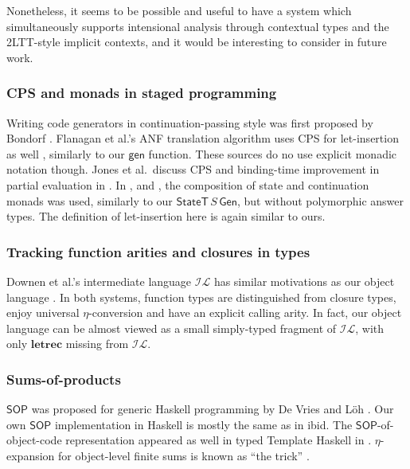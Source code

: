 \documentclass[acmsmall,screen]{acmart}
\newcommand{\mit}[1]{{\mathsf{#1}}}
\newcommand{\msf}[1]{{\mathsf{#1}}}
\newcommand{\mbf}[1]{{\mathbf{#1}}}
\newcommand{\SOP}{\msf{SOP}}
\theoremstyle{remark}
\newcommand{\Gen}{\msf{Gen}}
\newcommand{\gen}{\mit{gen}}
\newcommand{\StateT}{\msf{StateT}}
\begin{document}
Nonetheless, it seems to be possible and useful to have a
system which simultaneously supports intensional analysis through contextual
types and the 2LTT-style implicit contexts, and it would be interesting
to consider in future work.

\subsubsection*{CPS and monads in staged programming} Writing code generators
in continuation-passing style was first proposed by Bondorf
\cite{DBLP:conf/lfp/Bondorf92}. Flanagan et al.'s ANF translation algorithm uses
CPS for let-insertion as well \cite{DBLP:conf/pldi/FlanaganSDF93}, similarly to
our $\gen$ function. These sources do no use explicit monadic notation
though. Jones et al.\ discuss CPS and binding-time improvement in partial
evaluation in \cite{partial-evaluation}. In
\cite{DBLP:conf/emsoft/KiselyovST04}, \cite{DBLP:conf/pepm/SwadiTKP06} and
\cite{DBLP:journals/scp/CaretteK11}, the composition of state and continuation
monads was used, similarly to our $\StateT\,S\,\Gen$, but without polymorphic
answer types. The definition of let-insertion here is again similar to ours.

\subsubsection*{Tracking function arities and closures in types} Downen et al.'s
intermediate language $\mathcal{IL}$ has similar motivations as our object
language \cite{DBLP:journals/pacmpl/DownenAJE20}. In both systems, function
types are distinguished from closure types, enjoy universal $\eta$-conversion
and have an explicit calling arity. In fact, our object language can be almost
viewed as a small simply-typed fragment of $\mathcal{IL}$, with only
$\mbf{letrec}$ missing from $\mathcal{IL}$.

\subsubsection*{Sums-of-products} $\SOP$ was proposed for generic Haskell programming
by De Vries and Löh \cite{DBLP:conf/icfp/VriesL14}. Our own $\SOP$
implementation in Haskell is mostly the same as in ibid. The
$\SOP$-of-object-code representation appeared as well in typed Template Haskell
in \cite{DBLP:conf/haskell/PickeringLW20}. $\eta$-expansion for object-level
finite sums is known as ``the trick'' \cite{eta-expansion-trick}.
\end{document}

